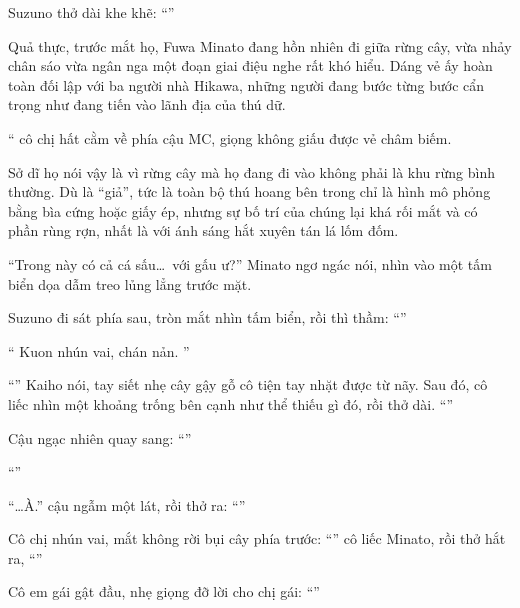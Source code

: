 \documentclass[../main.tex]{subfiles}
\begin{document}
Suzuno thở dài khe khẽ: ``''

Quả thực, trước mắt họ, Fuwa Minato đang hồn nhiên đi giữa rừng cây, vừa nhảy chân sáo vừa ngân nga một đoạn giai điệu nghe rất khó hiểu. Dáng vẻ ấy hoàn toàn đối lập với ba người nhà Hikawa, những người đang bước từng bước cẩn trọng như đang tiến vào lãnh địa của thú dữ.

`` cô chị hất cằm về phía cậu MC, giọng không giấu được vẻ châm biếm.

Sở dĩ họ nói vậy là vì rừng cây mà họ đang đi vào không phải là khu rừng bình thường. Dù là ``giả'', tức là toàn bộ thú hoang bên trong chỉ là hình mô phỏng bằng bìa cứng hoặc giấy ép, nhưng sự bố trí của chúng lại khá rối mắt và có phần rùng rợn, nhất là với ánh sáng hắt xuyên tán lá lốm đốm.


``Trong này có cả cá sấu\dots\ với gấu ư?'' Minato ngơ ngác nói, nhìn vào một tấm biển dọa dẫm treo lủng lẳng trước mặt.

Suzuno đi sát phía sau, tròn mắt nhìn tấm biển, rồi thì thầm: ``''

`` Kuon nhún vai, chán nản. ''

``'' Kaiho nói, tay siết nhẹ cây gậy gỗ cô tiện tay nhặt được từ nãy. Sau đó, cô liếc nhìn một khoảng trống bên cạnh như thể thiếu gì đó, rồi thở dài. ``''

Cậu ngạc nhiên quay sang: ``''

``''

``\dots À.'' cậu ngẫm một lát, rồi thở ra: ``''

Cô chị nhún vai, mắt không rời bụi cây phía trước: ``'' cô liếc Minato, rồi thở hắt ra, ``''

Cô em gái gật đầu, nhẹ giọng đỡ lời cho chị gái: ``''
\end{document}
